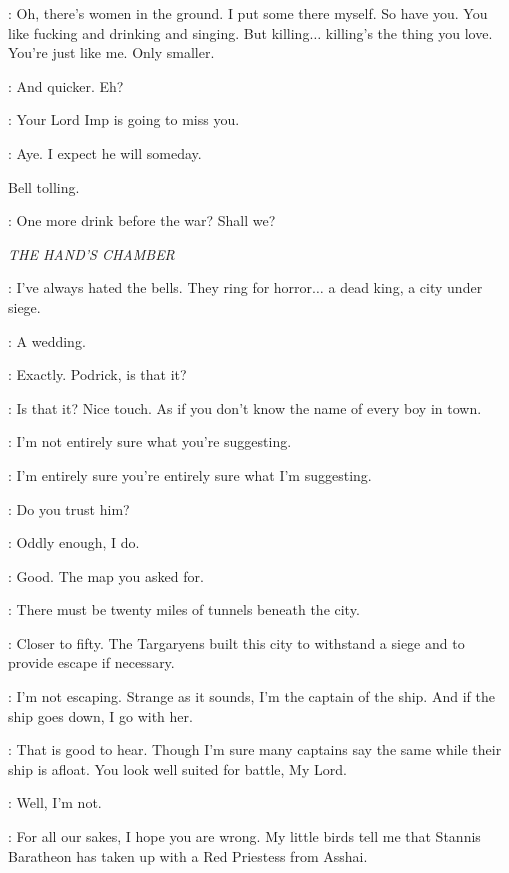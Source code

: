 \HOUND: Oh, there's women in the ground. I put some there myself. So have you. You like fucking and drinking and singing. But killing$\ldots$ killing's the thing you love. You're just like me. Only smaller. 

\BRONN: And quicker. Eh? 

\HOUND: Your Lord Imp is going to miss you. 


\BRONN: Aye. I expect he will someday. 

\sfx Bell tolling.

\BRONN: One more drink before the war? Shall we? 


\scene

\textit{THE HAND'S CHAMBER}


\VARYS: I've always hated the bells. They ring for horror$\ldots$ a dead king, a city under siege. 

\TYRION: A wedding. 

\VARYS: Exactly. Podrick, is that it? 

\TYRION: Is that it? Nice touch. As if you don't know the name of every boy in town. 

\VARYS: I'm not entirely sure what you're suggesting. 

\TYRION: I'm entirely sure you're entirely sure what I'm suggesting. 

\VARYS: Do you trust him? 

\TYRION: Oddly enough, I do. 

\VARYS: Good. The map you asked for. 

\TYRION: There must be twenty miles of tunnels beneath the city. 

\VARYS: Closer to fifty. The Targaryens built this city to withstand a siege and to provide escape if necessary. 

\TYRION: I'm not escaping. Strange as it sounds, I'm the captain of the ship. And if the ship goes down, I go with her. 

\VARYS: That is good to hear. Though I'm sure many captains say the same while their ship is afloat. You look well suited for battle, My Lord. 

\TYRION: Well, I'm not. 

\VARYS: For all our sakes, I hope you are wrong. My little birds tell me that Stannis Baratheon has taken up with a Red Priestess from Asshai. 

